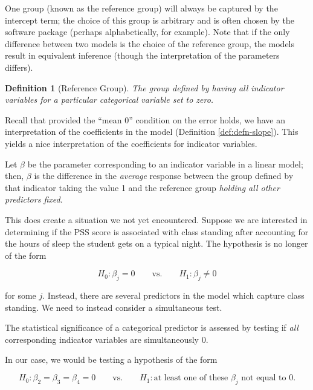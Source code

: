 \documentclass[
]{book}
\theoremstyle{plain}
\theoremstyle{mydefn}
\newtheorem{definition}{Definition}[chapter]
\theoremstyle{myexmpl}
\theoremstyle{remark}
\begin{document}
One group (known as the reference group) will always be captured by the intercept term; the choice of this group is arbitrary and is often chosen by the software package (perhaps alphabetically, for example). Note that if the only difference between two models is the choice of the reference group, the models result in equivalent inference (though the interpretation of the parameters differs).

\begin{definition}[Reference Group]
The group defined by having all indicator variables for a particular categorical variable set to zero.
\end{definition}

Recall that provided the ``mean 0'' condition on the error holds, we have an interpretation of the coefficients in the model (Definition \ref{def:defn-slope}). This yields a nice interpretation of the coefficients for indicator variables.

\begin{rmdkeyidea}
Let \(\beta\) be the parameter corresponding to an indicator variable in a linear model; then, \(\beta\) is the difference in the \emph{average} response between the group defined by that indicator taking the value 1 and the reference group \emph{holding all other predictors fixed}.
\end{rmdkeyidea}

This does create a situation we not yet encountered. Suppose we are interested in determining if the PSS score is associated with class standing after accounting for the hours of sleep the student gets on a typical night. The hypothesis is no longer of the form

\[H_0: \beta_j = 0 \qquad \text{vs.} \qquad H_1: \beta_j \neq 0\]

for some \(j\). Instead, there are several predictors in the model which capture class standing. We need to instead consider a simultaneous test.

\begin{rmdkeyidea}
The statistical significance of a categorical predictor is assessed by testing if \emph{all} corresponding indicator variables are simultaneously 0.
\end{rmdkeyidea}

In our case, we would be testing a hypothesis of the form

\[H_0: \beta_2 = \beta_3 = \beta_4 = 0 \qquad \text{vs.} \qquad H_1: \text{at least one of these } \beta_j \text{ not equal to 0}.\]
\end{document}
